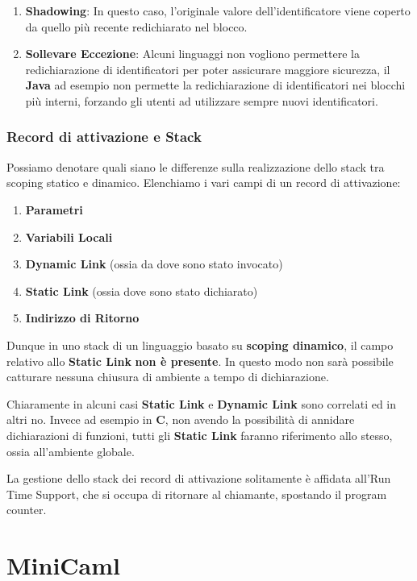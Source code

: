 \documentclass{article}
\begin{document}
\begin{enumerate}
    \item \textbf{Shadowing}: In questo caso, l'originale valore dell'identificatore viene coperto da quello più recente redichiarato nel blocco.
    \item \textbf{Sollevare Eccezione}: Alcuni linguaggi non vogliono permettere la redichiarazione di identificatori per poter assicurare maggiore sicurezza, il \textbf{Java} ad esempio non permette la redichiarazione di identificatori nei blocchi più interni, forzando gli utenti ad utilizzare sempre nuovi identificatori.
\end{enumerate}

\newpage

\subsubsection{Record di attivazione e Stack} Possiamo denotare quali siano le differenze sulla realizzazione dello stack tra scoping statico e dinamico. Elenchiamo i vari campi di un record di attivazione:

\begin{enumerate}
    \item \textbf{Parametri}
    \item \textbf{Variabili Locali}
    \item \textbf{Dynamic Link} (ossia da dove sono stato invocato)
    \item \textbf{Static Link} (ossia dove sono stato dichiarato)
    \item \textbf{Indirizzo di Ritorno}
\end{enumerate}

Dunque in uno stack di un linguaggio basato su \textbf{scoping dinamico}, il campo relativo allo \textbf{Static Link} \textbf{non è presente}. In questo modo non sarà possibile catturare nessuna chiusura di ambiente a tempo di dichiarazione.

Chiaramente in alcuni casi \textbf{Static Link} e \textbf{Dynamic Link} sono correlati ed in altri no. Invece ad esempio in \textbf{C}, non avendo la possibilità di annidare dichiarazioni di funzioni, tutti gli \textbf{Static Link} faranno riferimento allo stesso, ossia all'ambiente globale.

La gestione dello stack dei record di attivazione solitamente è affidata all'Run Time Support, che si occupa di ritornare al chiamante, spostando il program counter.

\section{MiniCaml}
\end{document}
